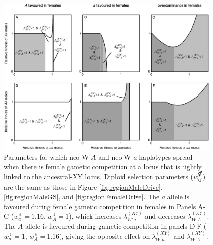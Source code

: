 \documentclass[12pt]{article}
\begin{document}
\begin{figure}[!h]
\centering
\centerline{\includegraphics[width=\linewidth]{Region_Plot_combined_FemaleGS.eps}}
\caption{
Parameters for which neo-W-$A$ and neo-W-$a$ haplotypes spread when there is female gametic competition at a locus that is tightly linked to the ancestral-XY locus.
Diploid selection parameters ($w_{ij}^\Hermaphrodite$) are the same as those in Figure \ref{fig:regionMaleDrive}, \ref{fig:regionMaleGS}, and \ref{fig:regionFemaleDrive}. 
The $a$ allele is favoured during female gametic competition in females in Panels A-C ($w_{a}^\female=1.16$, $w_{A}^\female=1$), which increases $\lambda_{W'a}^{(XY)}$ and decreases $\lambda_{W'A}^{(XY)}$. 
The $A$ allele is favoured during gametic competition in panels D-F ($w_{a}^\female=1$, $w_{A}^\female=1.16$), giving the opposite effect on $\lambda_{W'a}^{(XY)}$ and $\lambda_{W'A}^{(XY)}$. 
}
\label{fig:regionFemaleGS}
\end{figure}
\end{document}
